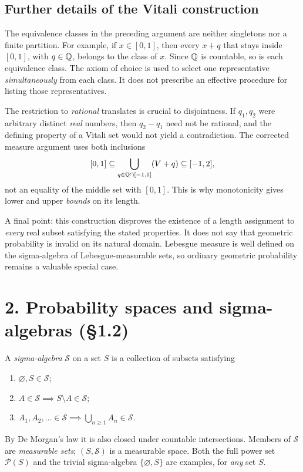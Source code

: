 \documentclass[10pt,a4paper]{article}
\begin{document}
\subsection*{Further details of the Vitali construction}
The equivalence classes in the preceding argument are neither singletons nor a finite partition. For example, if $x\in[0,1]$, then every $x+q$ that stays inside $[0,1]$, with $q\in\mathbb Q$, belongs to the class of $x$. Since $\mathbb Q$ is countable, so is each equivalence class. The axiom of choice is used to select one representative \emph{simultaneously} from each class. It does not prescribe an effective procedure for listing those representatives.

The restriction to \emph{rational} translates is crucial to disjointness. If $q_1,q_2$ were arbitrary distinct \emph{real} numbers, then $q_2-q_1$ need not be rational, and the defining property of a Vitali set would not yield a contradiction. The corrected measure argument uses both inclusions
\[
[0,1]\subseteq\bigcup_{q\in\mathbb Q\cap[-1,1]}(V+q)\subseteq[-1,2],
\]
not an equality of the middle set with $[0,1]$. This is why monotonicity gives lower and upper \emph{bounds} on its length.

A final point: this construction disproves the existence of a length assignment to \emph{every} real subset satisfying the stated properties. It does not say that geometric probability is invalid on its natural domain. Lebesgue measure is well defined on the sigma-algebra of Lebesgue-measurable sets, so ordinary geometric probability remains a valuable special case.

\section*{2. Probability spaces and sigma-algebras (\S1.2)}
A \emph{sigma-algebra} $\mathcal S$ on a set $S$ is a collection of subsets satisfying
\begin{enumerate}[leftmargin=*,label=(\roman*)]
\item $\varnothing,S\in\mathcal S$;
\item $A\in\mathcal S\implies S\setminus A\in\mathcal S$;
\item $A_1,A_2,\ldots\in\mathcal S\implies \bigcup_{n\ge1}A_n\in\mathcal S$.
\end{enumerate}
By De Morgan's law it is also closed under countable intersections. Members of $\mathcal S$ are \emph{measurable sets}; $(S,\mathcal S)$ is a measurable space. Both the full power set $\mathcal P(S)$ and the trivial sigma-algebra $\{\varnothing,S\}$ are examples, for \emph{any} set $S$.
\end{document}
